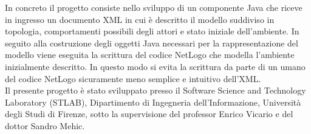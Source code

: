 In concreto il progetto consiste nello sviluppo di un componente Java che riceve in ingresso un documento XML in cui è descritto il modello suddiviso in topologia, comportamenti possibili degli attori e stato iniziale dell'ambiente. In seguito alla costruzione degli oggetti Java necessari per la rappresentazione del modello viene eseguita la scrittura del codice NetLogo che modella l'ambiente inizialmente descritto. In questo modo si evita la scrittura da parte di un umano del codice NetLogo sicuramente meno semplice e intuitivo dell'XML.\\
Il presente progetto è stato sviluppato presso il Software Science and Technology Laboratory (STLAB), Dipartimento di Ingegneria dell'Informazione, Università degli Studi di Firenze, sotto la supervisione del professor Enrico Vicario e del dottor Sandro Mehic.\\
 